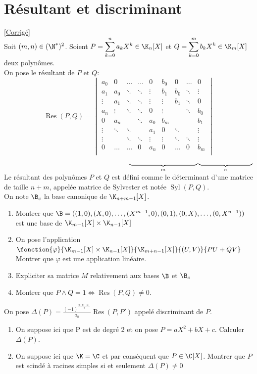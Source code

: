 \documentclass{book}
\begin{document}
	\section{Résultant et discriminant }
	\textcolor{blue}{\hyperref[sec:resultant-et-discriminant-etoile2]{[Corrigé]}}\\
	\label{Résultant}
	\label{Résultant et discriminant}
	Soit $(m,n)\in(\N^*)^2$. Soient $P=\displaystyle\sum\limits_{k=0}^{n}a_kX^k\in\K_n[X]$ et $Q=\displaystyle\sum\limits_{k=0}^{m}b_kX^k\in\K_m[X]$ deux polynômes.
	\\ On pose le résultant de $P$ et $Q$: $$\operatorname{Res}(P,Q)= 
	\begin{vmatrix}
		a_0 & 0&\dots &\dots &0 &b_0 &0  &\dots &0\\
		a_1 & a_0 &\ddots&\ddots &\vdots &b_1  &b_0 &\ddots &\vdots\\
		\vdots &a_1 &\ddots & \ddots &\vdots &\vdots &b_1 &\ddots &0\\
		a_n & \vdots &\ddots &\ddots &0&\vdots &  &\ddots &b_0\\
		0 &a_n & &\ddots &a_0 &b_m &  & &b_1 \\
		\vdots &\ddots  &\ddots & &a_1 &0 &\ddots  & &\vdots\\
		\vdots & &\ddots &\ddots &\vdots &\vdots &\ddots &\ddots &\vdots\\
		0 &\dots &\dots&0 &a_n &0 &\dots &0 &b_m \\
	\end{vmatrix}$$
	$\hspace{67mm}\hspace{2mm}\underbrace{\rule{38mm}{0pt}}_m \underbrace{\rule{30mm}{0pt}}_n$
	\\Le résultant des polynômes $P$ et $Q$ est défini comme le déterminant d'une matrice de taille $n+m$, appelée matrice de Sylvester et notée $\operatorname{Syl}(P,Q)$.
	\\On note $\B_c$ la base canonique de $\K_{n+m-1}[X]$.
	\begin{enumerate}
		\item Montrer que $\B=((1,0),(X,0),\dots,(X^{m-1},0),(0,1),(0,X),\dots, (0,X^{n-1}))$ est une base de $\K_{m-1}[X]\times\K_{n-1}[X]$
		\item On pose l'application $\fonction{\varphi}{\K_{m-1}[X]\times\K_{n-1}[X]}{\K_{m+n-1}[X]}{(U,V)}{PU+QV}$
		\\Montrer que $\varphi$ est une application linéaire. 
		\item Expliciter sa matrice $M$ relativement aux bases $\B$ et $\B_c$
		\item Montrer que $P\land Q=1\iff\operatorname{Res}(P,Q)\ne 0$.
	\end{enumerate}
	On pose $\Delta(P)=\displaystyle\frac{(-1)^\frac{n(n-1)}{2}}{a_n}\operatorname{Res}(P,P')$ appelé discriminant de $P$.
	\begin{enumerate}[resume]
		\item On suppose ici que P est de degré 2 et on pose $P=aX^2+bX+c$. Calculer $\Delta(P).$
		\item On suppose ici que $\K=\C$ et par conséquent que $P\in\C[X]$. Montrer que $P$ est scindé à racines simples si et seulement $\Delta(P)\ne 0$
	\end{enumerate}
	
\end{document}
